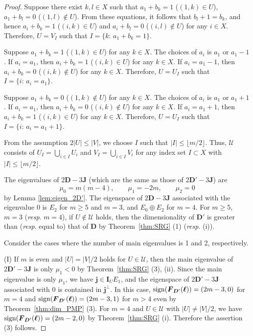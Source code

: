 \documentclass[a4paper, 11pt]{article}
\newcommand{\J}{\boldsymbol{J}}
\newcommand{\I}{\boldsymbol{I}}
\newcommand{\D}{\boldsymbol{D}}
\newcommand{\F}{\boldsymbol{F}}
\newcommand{\jv}{\boldsymbol{j}}
\newcommand{\el}{\boldsymbol{\ell}}
\theoremstyle{definition}
\begin{document}
\begin{proof}
Suppose there exist $k,l\in X$ such that $a_1+b_k=1$ ($(1,k) \in U$), $a_1+b_l=0$ ($(1,l) \not\in U$). From these equations, it follows that $b_l+1=b_k$, and hence $a_i+b_k=1$ ($(i,k) \in U$) and $a_i+b_l=0$ ($(i,l) \not\in U$) for any $i \in X$. 
Therefore, $U=V_I$ such that $I=\{k \colon\, a_1+b_k=1\}$.

Suppose $a_1+b_k=1$ ($(1,k) \in U$) for any $k\in X$. 
The choices of $a_i$ is $a_1$ or $a_1-1$. 
If $a_i=a_1$, then $a_i+b_k=1$ ($(i,k) \in U$) for any $k \in X$. 
If $a_i=a_1-1$, then $a_i+b_k=0$ ($(i,k) \not\in U$) for any $k \in X$. 
Therefore, $U=U_I$ such that $I=\{i \colon\, a_i=a_1\}$. 

Suppose $a_1+b_k=0$ ($(1,k) \not\in U$) for any $k\in X$. 
The choices of $a_i$ is $a_1$ or $a_1+1$. 
If $a_i=a_1$, then $a_i+b_k=0$ ($(i,k) \not\in U$) for any $k \in X$. 
If $a_i=a_1+1$, then $a_i+b_k=1$ ($(i,k) \in U$) for any $k \in X$. 
Therefore, $U=U_I$ such that $I=\{i \colon\, a_i=a_1+1\}$. 

From the assumption $2|U| \leq |V|$, we choose $I$ such that $|I| \leq \lfloor m/2 \rfloor$.
Thus, $\mathcal{U}$ consists of $U_I=\bigcup_{i \in I} U_i$ and $V_I=\bigcup_{i \in I} V_i$ for any index set $I\subset X$ with $|I| \leq \lfloor m/2 \rfloor$.




The eigenvalues of $2\D-3\J$ (which are the same as those of  $2\D'-3\J$) are 
\[\mu_0=m(m-4),\qquad \mu_1=-2m, \qquad \mu_2=0\]
by Lemma \ref{lem:eigen_2D'}. 
The eigenspace of $2\D-3\J$ associated with the eigenvalue 0 is 
$E_2$ for $m\geq 5$ and $m=3$, and $E_0 \oplus E_2$ for $m=4$. 
For $m \geq  5$, $m=3$ ({\it resp}. $m=4$), 
if $U \not\in \mathcal{U}$ holds, then
the dimensionality of $\D'$ is greater than ({\it resp}. equal to) that of $\D$ by Theorem~\ref{thm:SRG} (1) ({\it resp}. (i)). 

Consider the cases where the number of main eigenvalues is 1 and 2, respectively. 

(I) If $m$ is even and $|U|=|V|/2$ holds for $U \in \mathcal{U}$, then the main eigenvalue of $2\D'-3 \J$ is only $\mu_1<0$ by Theorem~\ref{thm:SRG} (3), (ii). 
Since the main eigenvalue is only $\mu_1$, we have 
$\jv \in \I_U E_1$, and the eigenspace of $2\D'-3\J$ associated with $0$ is contained in $\jv^\perp$.  
In this case, ${\rm sign} (\F_{\D'}(\el))=(2m-3,0)$ for $m=4$ and ${\rm sign} (\F_{\D'}(\el))=(2m-3,1)$ for $m>4$ even by Theorem~\ref{thm:dim_PMP} (3).   
For $m=4$ and $U \in \mathcal{U}$ with $|U|\ne |V|/2$, we have ${\rm sign} (\F_{\D'}(\el))=(2m-2,0)$ by Theorem~\ref{thm:SRG} (i). 
Therefore the assertion (3) follows. 


\end{proof}
\end{document}
